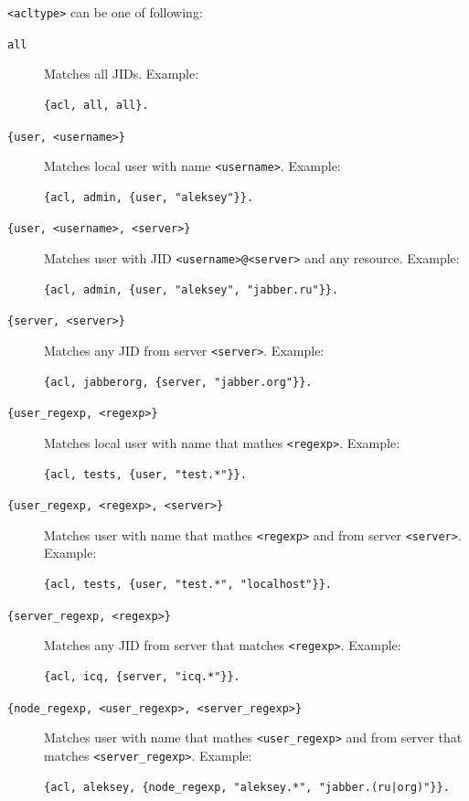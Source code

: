 \documentclass[10pt]{article}
\begin{document}
\texttt{<acltype>} can be one of following:
\begin{description}
\item[\texttt{all}] Matches all JIDs.  Example:
\begin{verbatim}
{acl, all, all}.
\end{verbatim}

\item[\texttt{\{user, <username>\}}] Matches local user with name
  \texttt{<username>}.  Example:
\begin{verbatim}
{acl, admin, {user, "aleksey"}}.
\end{verbatim}

\item[\texttt{\{user, <username>, <server>\}}] Matches user with JID
  \texttt{<username>@<server>} and any resource.  Example:
\begin{verbatim}
{acl, admin, {user, "aleksey", "jabber.ru"}}.
\end{verbatim}

\item[\texttt{\{server, <server>\}}] Matches any JID from server
  \texttt{<server>}.  Example:
\begin{verbatim}
{acl, jabberorg, {server, "jabber.org"}}.
\end{verbatim}

\item[\texttt{\{user\_regexp, <regexp>\}}] Matches local user with name that
  mathes \texttt{<regexp>}.  Example:
\begin{verbatim}
{acl, tests, {user, "test.*"}}.
\end{verbatim}

\item[\texttt{\{user\_regexp, <regexp>, <server>\}}] Matches user with name
  that mathes \texttt{<regexp>} and from server \texttt{<server>}.  Example:
\begin{verbatim}
{acl, tests, {user, "test.*", "localhost"}}.
\end{verbatim}

\item[\texttt{\{server\_regexp, <regexp>\}}] Matches any JID from server that
  matches \texttt{<regexp>}.  Example:
\begin{verbatim}
{acl, icq, {server, "icq.*"}}.
\end{verbatim}

\item[\texttt{\{node\_regexp, <user\_regexp>, <server\_regexp>\}}] Matches user
  with name that mathes \texttt{<user\_regexp>} and from server that matches
  \texttt{<server\_regexp>}.  Example:
\begin{verbatim}
{acl, aleksey, {node_regexp, "aleksey.*", "jabber.(ru|org)"}}.
\end{verbatim}


\end{description}
\end{document}
